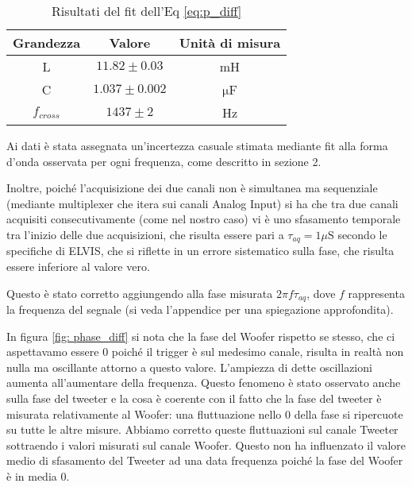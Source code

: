 \documentclass[../Relazione_circuiti]{subfiles}
\begin{document}
\begin{table}[H]
\centering

\begin{tabular}{c | c | c}
Grandezza & Valore & Unità di misura \\
\hline
L & $ 11.82 \pm 0.03 $ & mH \\
C & $ 1.037 \pm 0.002 $ & $\mathrm{\mu}$F \\
$f_{cross}$ & $ 1437 \pm 2$ & Hz

\end{tabular}
\caption{Risultati del fit dell'Eq \ref{eq:p_diff}}
\label{tab: fit_phase}

\end{table}
Ai dati è stata assegnata un'incertezza casuale stimata mediante fit alla forma d'onda osservata per ogni frequenza, come descritto in sezione 2. 

Inoltre, poiché l'acquisizione dei due canali non è simultanea ma sequenziale (mediante multiplexer che itera sui canali Analog Input) si ha che tra due canali acquisiti consecutivamente (come nel nostro caso) vi è uno sfasamento temporale tra l'inizio delle due acquisizioni, che risulta essere pari a $\tau_{aq}=1 \mu \mathrm{S}$ secondo le specifiche di ELVIS, che si riflette in un errore sistematico sulla fase, che risulta essere inferiore al valore vero.

Questo è stato corretto aggiungendo alla fase misurata  $ 2 \pi f \tau_{aq}$, dove $f$ rappresenta la frequenza del segnale (si veda l'appendice per una spiegazione approfondita).

In figura \ref{fig: phase_diff} si nota che la fase del Woofer rispetto se stesso, che ci aspettavamo essere 0 poiché il trigger è sul medesimo canale, risulta in realtà non nulla ma oscillante attorno a questo valore. L'ampiezza di dette oscillazioni aumenta all'aumentare della frequenza. Questo fenomeno è stato osservato anche sulla fase del tweeter e la cosa è coerente con il fatto che la fase del tweeter è misurata relativamente al Woofer: una fluttuazione nello 0 della fase si ripercuote su tutte le altre misure. Abbiamo corretto queste fluttuazioni sul canale Tweeter sottraendo i valori misurati sul canale Woofer. Questo non ha influenzato il valore medio di sfasamento del Tweeter ad una data frequenza poiché la fase del Woofer è in media 0.
\end{document}
